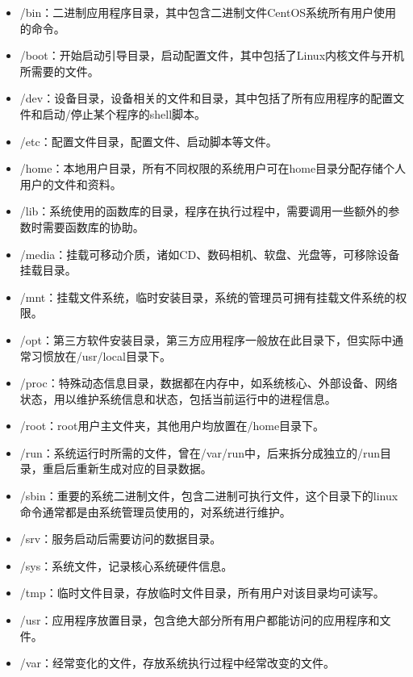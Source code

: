 \documentclass[12pt, openany, oneside]{book}
\begin{document}
\begin{itemize}
    \item /bin：二进制应用程序目录，其中包含二进制文件CentOS系统所有用户使用的命令。

    \item /boot：开始启动引导目录，启动配置文件，其中包括了Linux内核文件与开机所需要的文件。

    \item /dev：设备目录，设备相关的文件和目录，其中包括了所有应用程序的配置文件和启动/停止某个程序的shell脚本。

    \item /etc：配置文件目录，配置文件、启动脚本等文件。

    \item /home：本地用户目录，所有不同权限的系统用户可在home目录分配存储个人用户的文件和资料。

    \item /lib：系统使用的函数库的目录，程序在执行过程中，需要调用一些额外的参数时需要函数库的协助。

    \item /media：挂载可移动介质，诸如CD、数码相机、软盘、光盘等，可移除设备挂载目录。

    \item /mnt：挂载文件系统，临时安装目录，系统的管理员可拥有挂载文件系统的权限。

    \item /opt：第三方软件安装目录，第三方应用程序一般放在此目录下，但实际中通常习惯放在/usr/local目录下。

    \item /proc：特殊动态信息目录，数据都在内存中，如系统核心、外部设备、网络状态，用以维护系统信息和状态，包括当前运行中的进程信息。

    \item /root：root用户主文件夹，其他用户均放置在/home目录下。

    \item /run：系统运行时所需的文件，曾在/var/run中，后来拆分成独立的/run目录，重启后重新生成对应的目录数据。

    \item /sbin：重要的系统二进制文件，包含二进制可执行文件，这个目录下的linux命令通常都是由系统管理员使用的，对系统进行维护。

    \item /srv：服务启动后需要访问的数据目录。

    \item /sys：系统文件，记录核心系统硬件信息。

    \item /tmp：临时文件目录，存放临时文件目录，所有用户对该目录均可读写。

    \item /usr：应用程序放置目录，包含绝大部分所有用户都能访问的应用程序和文件。

    \item /var：经常变化的文件，存放系统执行过程中经常改变的文件。
\end{itemize}
\end{document}

